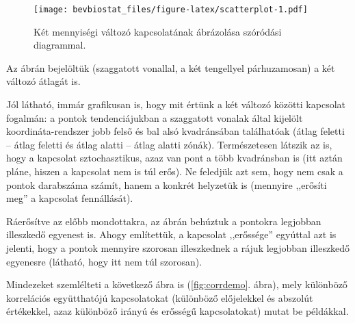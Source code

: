 \documentclass[]{book}
\newenvironment{Shaded}{\begin{snugshade}}{\end{snugshade}}
\newcommand{\KeywordTok}[1]{\textcolor[rgb]{0.13,0.29,0.53}{\textbf{#1}}}
\newcommand{\DataTypeTok}[1]{\textcolor[rgb]{0.13,0.29,0.53}{#1}}
\newcommand{\StringTok}[1]{\textcolor[rgb]{0.31,0.60,0.02}{#1}}
\newcommand{\OperatorTok}[1]{\textcolor[rgb]{0.81,0.36,0.00}{\textbf{#1}}}
\newcommand{\NormalTok}[1]{#1}
\begin{document}
\begin{Shaded}
\end{Shaded}

\begin{figure}
\centering
\texttt{[image: bevbiostat\_files/figure-latex/scatterplot-1.pdf]}
\caption{\label{fig:scatterplot}Két mennyiségi változó kapcsolatának
ábrázolása szóródási diagrammal.}
\end{figure}

Az ábrán bejelöltük (szaggatott vonallal, a két tengellyel párhuzamosan)
a két változó átlagát is.

Jól látható, immár grafikusan is, hogy mit értünk a két változó közötti
kapcsolat fogalmán: a pontok tendenciájukban a szaggatott vonalak által
kijelölt koordináta-rendszer jobb felső és bal alsó kvadránsában
találhatóak (átlag feletti -- átlag feletti és átlag alatti -- átlag
alatti zónák). Természetesen látszik az is, hogy a kapcsolat
sztochasztikus, azaz van pont a több kvadránsban is (itt aztán pláne,
hiszen a kapcsolat nem is túl erős). Ne feledjük azt sem, hogy nem csak
a pontok darabszáma számít, hanem a konkrét helyzetük is (mennyire
,,erősíti meg'' a kapcsolat fennállását).

Ráerősítve az előbb mondottakra, az ábrán behúztuk a pontokra legjobban
illeszkedő egyenest is. Ahogy említettük, a kapcsolat ,,erőssége''
egyúttal azt is jelenti, hogy a pontok mennyire szorosan illeszkednek a
rájuk legjobban illeszkedő egyenesre (látható, hogy itt nem túl
szorosan).

Mindezeket szemlélteti a következő ábra is (\ref{fig:corrdemo}. ábra),
mely különböző korrelációs együtthatójú kapcsolatokat (különböző
előjelekkel és abszolút értékekkel, azaz különböző irányú és erősségű
kapcsolatokat) mutat be példákkal.
\end{document}
